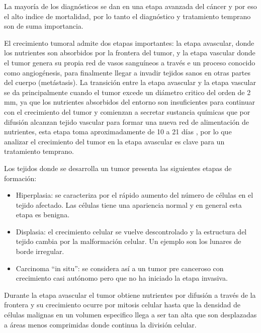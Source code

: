 La mayoría de los diagnósticos se dan en una etapa avanzada del cáncer y por eso el alto indice de mortalidad, por lo tanto el diagnóstico y tratamiento temprano son de suma importancia. 

El crecimiento tumoral admite dos etapas importantes: la etapa avascular, donde los nutrientes son  absorbidos por la frontera del tumor, y la etapa vascular donde el tumor genera su propia red de vasos sanguíneos a través e un proceso conocido como angiogénesis, para finalmente llegar a invadir tejidos sanos en otras partes del cuerpo (metástasis). La transición entre la etapa avascular y la etapa vascular se da principalmente cuando el tumor excede un diámetro critico del orden de 2 mm, ya que los nutrientes absorbidos del entorno son insuficientes para continuar con el crecimiento del tumor y comienzan a secretar sustancia químicas que por difusión alcanzan tejido vascular para formar una nueva red de alimentación de nutrientes, esta etapa toma aproximadamente de 10 a 21 días \citep{macklin2009multiscale}, por lo que analizar el crecimiento del tumor en la etapa avascular es clave para un tratamiento temprano.


Los tejidos donde se desarrolla un tumor presenta las siguientes etapas de formación:
\begin{itemize}
	\item Hiperplasia: se caracteriza por el rápido aumento del número de células en el tejido afectado. Las células tiene una apariencia normal y en general esta etapa es benigna.
	\item Displasia: el crecimiento celular se vuelve descontrolado y la estructura del tejido cambia por la malformación celular. Un ejemplo son los lunares de borde irregular.
	\item Carcinoma ``in situ'': se considera así a un tumor pre canceroso con crecimiento casi autónomo pero que no ha iniciado la etapa invasiva.
\end{itemize}
Durante la etapa avascular el tumor obtiene nutrientes por difusión a través de la frontera y su crecimiento ocurre por mitosis celular hasta que la densidad de células malignas en un volumen especifico llega a ser tan alta que son desplazadas a áreas menos comprimidas donde continua la división celular. 

